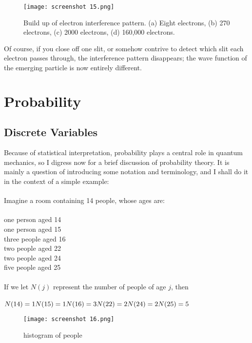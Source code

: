 \documentclass[svgnames]{article}   	%
\begin{document}
\begin{figure}[hb!]
  \centering
    \texttt{[image: screenshot 15.png]}
    \caption{Build up of electron interference pattern. (a) Eight electrons,
    (b) 270 electrons, (c) 2000 electrons, (d) 160,000 electrons.}
\end{figure}
Of course, if you close off one slit, or somehow contrive to detect which slit
each electron passes through, the interference pattern disappears; the wave
function of the emerging particle is now entirely different.

\vspace{20px}
\section{Probability}
\subsection{Discrete Variables}
\vspace{20px}

Because of statistical interpretation, probability plays a central role in
quantum mechanics, so I digress now for a brief discussion of probability
theory. It is mainly a question of introducing some notation and terminology,
and I shall do it in the context of a simple example: \\\\

Imagine a room containing 14 people, whose ages are: \\\\

\noindent one person aged 14\\
one person aged 15\\
three people aged 16\\
two people aged 22\\
two people aged 24\\
five people aged 25\\\\

If we let $N(j)$ represent the number of people of age $j$, then \\\\
$
N(14) = 1 \\
N(15) = 1 \\
N(16) = 3 \\
N(22) = 2 \\
N(24) = 2 \\
N(25) = 5 \\ \\ 
$
\begin{figure}[htb!]
  \centering
    \texttt{[image: screenshot 16.png]}
    \caption{histogram of people}
\end{figure}
\end{document}
